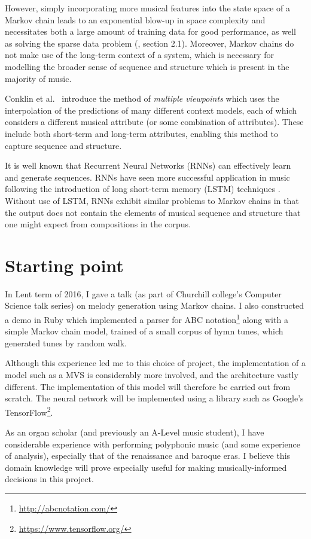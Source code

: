 \documentclass[12pt,a4paper,twoside]{article}
\begin{document}
However, simply incorporating more musical features into the state space of a
Markov chain leads to an exponential blow-up in space complexity and
necessitates both a large amount of training data for good performance, as well
as solving the sparse data problem (\cite{conklin2003music}, section 2.1).
Moreover, Markov chains do not make use of the long-term context of a system,
which is necessary for modelling the broader sense of sequence and structure
which is present in the majority of music.

Conklin et al.\ \cite{conklin1995viewpoints} introduce the method of
\emph{multiple viewpoints} which uses the interpolation of the predictions of
many different context models, each of which considers a different musical
attribute (or some combination of attributes). These include both short-term and
long-term attributes, enabling this method to capture sequence and structure.

It is well known that Recurrent Neural Networks (RNNs) can effectively learn and
generate sequences. RNNs have seen more successful application in music
following the introduction of long short-term memory (LSTM) techniques
\cite{eck2002lstm}.  Without use of LSTM, RNNs exhibit similar problems to
Markov chains in that the output does not contain the elements of musical
sequence and structure that one might expect from compositions in the corpus.

\section*{Starting point}

In Lent term of 2016, I gave a talk (as part of Churchill college's Computer
Science talk series) on melody generation using Markov chains. I also
constructed a demo in Ruby which implemented a parser for ABC
notation\footnote{\url{http://abcnotation.com/}} along with a simple Markov
chain model, trained of a small corpus of hymn tunes, which generated tunes by
random walk. 

Although this experience led me to this choice of project, the implementation of
a model such as a MVS is considerably more involved, and
the architecture vastly different. The implementation of this model will
therefore be carried out from scratch.  The neural network will be implemented
using a library such as Google's
TensorFlow\footnote{\url{https://www.tensorflow.org/}}.

As an organ scholar (and previously an A-Level music student), I have
considerable experience with performing polyphonic music (and some experience of
analysis), especially that of the renaissance and baroque eras. I believe this
domain knowledge will prove especially useful for making musically-informed
decisions in this project. 
\end{document}
